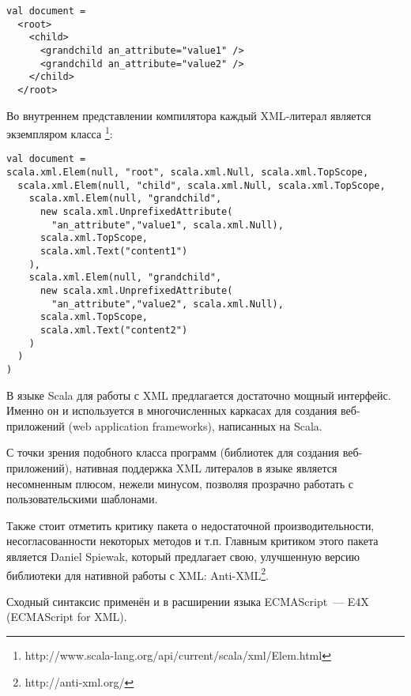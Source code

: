 \begin{code}\begin{lstlisting}[caption={Пример использования литералов XML в языке Scala.}, label=scala-xml-example]
val document =
  <root>
    <child>
      <grandchild an_attribute="value1" />
      <grandchild an_attribute="value2" />
    </child>
  </root>
\end{lstlisting}\end{code}

\begin{code}
Во внутреннем представлении компилятора каждый XML-литерал является экземпляром класса \footnote{http://www.scala-lang.org/api/current/scala/xml/Elem.html}:

\begin{lstlisting}[caption={Внутреннее представление XML литералов из примера~\ref{scala-xml-example}.}, label={scala-xml-example-internal}]
val document =
scala.xml.Elem(null, "root", scala.xml.Null, scala.xml.TopScope,
  scala.xml.Elem(null, "child", scala.xml.Null, scala.xml.TopScope,
    scala.xml.Elem(null, "grandchild",
      new scala.xml.UnprefixedAttribute(
        "an_attribute","value1", scala.xml.Null),
      scala.xml.TopScope,
      scala.xml.Text("content1")
    ),
    scala.xml.Elem(null, "grandchild",
      new scala.xml.UnprefixedAttribute(
        "an_attribute","value2", scala.xml.Null),
      scala.xml.TopScope,
      scala.xml.Text("content2")
    )
  )
)
\end{lstlisting}\end{code}

В языке Scala для работы с XML предлагается достаточно мощный интерфейс. Именно он и используется в многочисленных каркасах для создания веб-приложений (web application frameworks), написанных на Scala.

С точки зрения подобного класса программ (библиотек для создания веб-приложений), нативная поддержка XML
литералов в языке является несомненным плюсом, нежели минусом, позволяя прозрачно работать с пользовательскими шаблонами.

Также стоит отметить критику пакета  о недостаточной производительности, несогласованности некоторых методов и т.п.
Главным критиком этого пакета является Daniel Spiewak, который предлагает свою, улучшенную версию библиотеки для нативной работы с XML: Anti-XML\footnote{http://anti-xml.org/}.

\clearpage
Сходный синтаксис применён и в расширении языка ECMAScript~--- E4X~\cite{E4X} (ECMAScript for XML).

